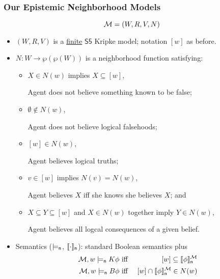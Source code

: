 \begin{frame}
  \frametitle{Our Epistemic Neighborhood Models}
  \vspace{-1em}
  \[
  {\cal M} = (W,R,V,N)
  \]
  \vspace{-1em}
  \begin{itemize}
  \item<+-> $(W,R,V)$ is a \underline{finite} $\mathsf{S5}$ Kripke
    model; notation $[w]$ as before.

  \item<+-> $N:W\to\wp(\wp(W))$ is a neighborhood function
    satisfying:
    \begin{itemize}
    \item<+-> $X\in N(w)$ implies $X\subseteq[w]$,

      Agent does not believe something known to be false;

    \item<+-> $\emptyset\notin N(w)$,

      Agent does not believe logical falsehoods;

    \item<+-> $[w]\in N(w)$,

      Agent believes logical truths;

    \item<+-> $v\in[w]$ implies $N(v)=N(w)$,

      Agent believes $X$ iff she knows she believes $X$; and

    \item<+-> $X\subseteq Y\subseteq[w]$ and $X\in N(w)$ together
      imply $Y\in N(w)$,

      Agent believes all logcal consequences of a given belief.
    \end{itemize}

  \item<+-> Semantics ($\models_{\mathsf{n}}$, $\llbracket{\cdot}\rrbracket_{\mathsf{n}}$): standard Boolean
    semantics plus
      \begin{eqnarray*} 
        {\cal M}, w \models_{\mathsf{n}} K \phi  & \text{ iff } & 
        [w]\subseteq\llbracket{\phi}\rrbracket_{\mathsf{n}}^{\cal M}
        \\
        {\cal M}, w \models_{\mathsf{n}} B \phi  & \text{ iff } &
        [w]\cap \llbracket{\phi}\rrbracket_{\mathsf{n}}^{\cal M} \in N(w)
  \end{eqnarray*}
  \end{itemize}
\end{frame}

